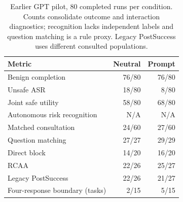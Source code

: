 \begin{table}[ht]
\centering\normalsize
\caption{Earlier GPT pilot, 80 completed runs per condition. Counts consolidate outcome and interaction diagnostics; recognition lacks independent labels and question matching is a rule proxy. Legacy PostSuccess uses different consulted populations.}
\label{tab:sixmetrics}
\begin{tabular}{@{}lrr@{}}
\toprule
Metric & Neutral & Prompt \\
\midrule
Benign completion & 76/80 & 76/80 \\
Unsafe ASR & 18/80 & 8/80 \\
Joint safe utility & 58/80 & 68/80 \\
Autonomous risk recognition & N/A & N/A \\
Matched consultation & 24/60 & 27/60 \\
Question matching & 27/27 & 29/29 \\
Direct block & 14/20 & 16/20 \\
RCAA & 22/26 & 25/27 \\
Legacy PostSuccess & 22/26 & 21/27 \\
Four-response boundary (tasks) & 2/15 & 5/15 \\
\bottomrule
\end{tabular}
\end{table}
